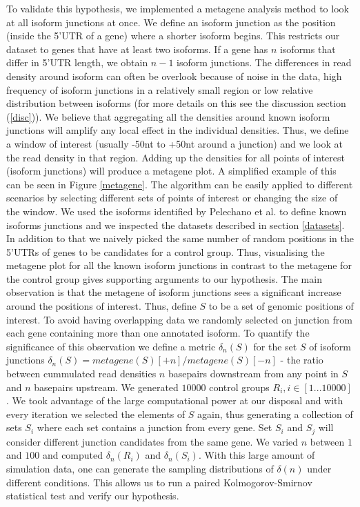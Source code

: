 \documentclass[12pt]{article}
\begin{document}
To validate this hypothesis, we implemented a metagene analysis method to look at all isoform junctions at once. We define an isoform junction as the position (inside the 5'UTR of a gene) where a shorter isoform begins. This restricts our dataset to genes that have at least two isoforms. If a gene has $n$ isoforms that differ in 5'UTR length, we obtain $n - 1$ isoform junctions. The differences in read density around isoform can often be overlook because of noise in the data, high frequency of isoform junctions in a relatively small region or low relative distribution between isoforms (for more details on this see the discussion section (\ref{disc})). We believe that aggregating all the densities around known isoform junctions will amplify any local effect in the individual densities. Thus, we define a window of interest (usually -50nt to +50nt around a junction) and we look at the read density in that region. Adding up the densities for all points of interest (isoform junctions) will produce a metagene plot. A simplified example of this can be seen in Figure \ref{metagene}. The algorithm can be easily applied to different scenarios by selecting different sets of points of interest or changing the size of the window. 
We used the isoforms identified by Pelechano et al. \cite{Pelechano2013} to define known isoforms junctions and we inspected the datasets described in section \ref{datasets}. In addition to that we naively picked the same number of random positions in the 5'UTRs of genes to be candidates for a control group. Thus, visualising the metagene plot for all the known isoform junctions in contrast to the metagene for the control group gives supporting arguments to our hypothesis. The main observation is that the metagene of isoform junctions sees a significant increase around the positions of interest. 
Thus, define $S$ to be a set of genomic positions of interest. To avoid having overlapping data we randomly selected on junction from each gene containing more than one annotated isoform.  
To quantify the significance of this observation we define a metric $\delta_n(S)$ for the set $S$ of isoform junctions $\delta_n(S) = metagene(S)[+n] / metagene(S)[-n]$ - the ratio between cummulated read densities $n$ basepairs downstream from any point in $S$ and $n$ basepairs upstream. We generated $10000$ control groups $R_i, i \in [1...10000]$. We took advantage of the large computational power at our disposal and with every iteration we selected the elements of $S$ again, thus generating a collection of sets $S_i$ where each set contains a junction from every gene. Set $S_i$ and $S_j$ will consider different junction candidates from the same gene. We varied $n$ between $1$ and $100$ and computed $\delta_n(R_i)$ and $\delta_n(S_i)$. With this large amount of simulation data, one can generate the sampling distributions of $\delta(n)$ under different conditions. This allows us to run a paired Kolmogorov-Smirnov \cite{Massey1951} statistical test and verify our hypothesis. 
\end{document}
